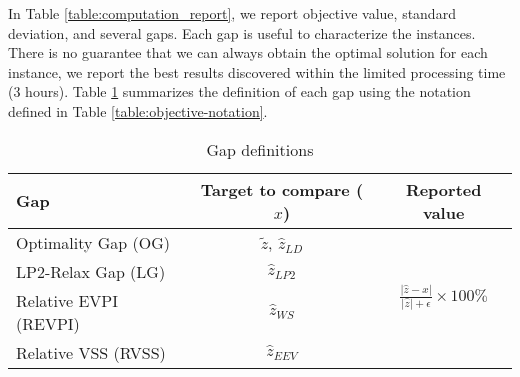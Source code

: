 In Table \ref{table:computation_report}, we report objective value, standard deviation, and several gaps. Each gap is useful to characterize the instances. There is no guarantee that we can always obtain the optimal solution for each instance, we report the best results discovered within the limited processing time (3 hours). Table \ref{table:gap} summarizes the definition of each gap using the notation defined in Table \ref{table:objective-notation}.


\begin{table}[H]
	\centering
	\caption{Gap definitions}
	\label{table:gap}
	\begin{tabular}{lcc}
		\hline
		Gap   & Target to compare ($x$) & Reported value                                                        \\ \hline
		Optimality Gap (OG)   & $\tilde{z}$, $\hat{z}_{LD}$    & \multirow{4}{*}{$\frac{|\hat{z}-x|}{|\hat{z}|+\epsilon}\times 100\%$} \\
		LP2-Relax Gap (LG)   & $\hat{z}_{LP2}$    &                                                                       \\
		Relative EVPI (REVPI) & $\hat{z}_{WS}$     &                                                                       \\
		Relative VSS (RVSS)  & $\hat{z}_{EEV}$    &                                                                       \\ \hline
	\end{tabular}
\end{table}

